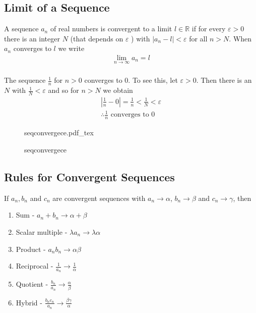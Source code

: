 \documentclass[a4paper]{article}
\newcommand{\incfig}[2][1]{%
    \def\svgwidth{#1\columnwidth}
    {#2.pdf_tex}
}
\theoremstyle{plain}
\theoremstyle{definition}
\newtheorem{defn}{Definition}[section]
\newtheorem{exmp}{Example}[section]
\theoremstyle{remark}
\begin{document}
\subsection{Limit of a Sequence}
\begin{tcolorbox}[colback=black!3!white,colframe=black!60!white,title=\begin{defn}Convergence of a sequence \label{Convergence of a sequence}\end{defn}]
A sequence $a_n$ of real numbers is convergent to a limit $l \in \mathbb{R}$ if for every $\varepsilon > 0$ there is an integer $N$ (that depends on $\varepsilon$ ) with $|a_n -l | < \varepsilon$ for all $n > N$. When $a_n$ converges to $l$ we write
\begin{align}
\lim_{n \to \infty} a_n = l \\
\end{align}
\end{tcolorbox}
\begin{tcolorbox}[colback=black!3!white,colframe=black!60!white,title=\begin{exmp}Example 1 \label{Example 1}\end{exmp}]
        The sequence $\frac{1}{n}$ for $n > 0$ converges to $0$. To see this, let $\varepsilon > 0 $. Then there is an $N$ with $\frac{1}{N}<\varepsilon$ and so for $n > N$ we obtain
                \begin{align}
                 \left| \frac{1}{n}-0\right| = \frac{1}{n} < \frac{1}{N} < \varepsilon \\
		 \therefore \frac{1}{n} \text{ converges to }0
                \end{align}
\begin{figure}[H]
    \centering
    \incfig{seqconvergece}
    \caption{seqconvergece}
    \label{fig:seqconvergece}
\end{figure}
\end{tcolorbox}
\subsection{Rules for Convergent Sequences}
If $a_n, b_n$ and $c_n$ are convergent sequences with $a_n \to \alpha$, $b_n \to \beta$ and $c_n \to \gamma$, then
\begin{enumerate}
	\item Sum - $a_n + b_n \to \alpha + \beta$
	\item Scalar multiple - $\lambda a_n \to \lambda\alpha$
	\item Product - $a_nb_n \to \alpha\beta$ \\
	\item Reciprocal - $\frac{1}{a_n}\to \frac{1}{\alpha}$ \\
	\item Quotient - $\frac{b_n}{a_n} \to \frac{\alpha}{\beta}$ \\
	\item Hybrid -  $\frac{b_nc_n}{a_n} \to \frac{\beta\gamma}{\alpha}$
\end{enumerate}
\end{document}
